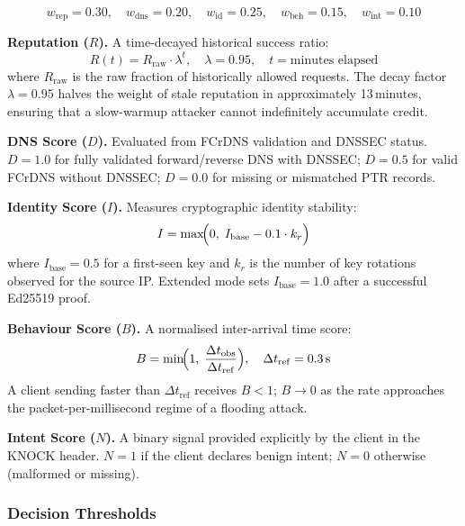 \documentclass[10pt,conference]{IEEEtran}
\begin{document}
\begin{equation}
  w_{\mathrm{rep}} = 0.30,\quad
  w_{\mathrm{dns}} = 0.20,\quad
  w_{\mathrm{id}}  = 0.25,\quad
  w_{\mathrm{beh}} = 0.15,\quad
  w_{\mathrm{int}} = 0.10
\end{equation}

\textbf{Reputation ($R$).}  A time-decayed historical success ratio:
\begin{equation}
  \label{eq:rep}
  R(t) = R_{\mathrm{raw}} \cdot \lambda^{t},
  \quad \lambda = 0.95,\quad t = \text{minutes elapsed}
\end{equation}
where $R_{\mathrm{raw}}$ is the raw fraction of historically allowed
requests.  The decay factor $\lambda = 0.95$ halves the weight of
stale reputation in approximately 13\,minutes, ensuring that a
slow-warmup attacker cannot indefinitely accumulate credit.

\textbf{DNS Score ($D$).}  Evaluated from FCrDNS validation and
DNSSEC status.  $D = 1.0$ for fully validated forward/reverse DNS
with DNSSEC; $D = 0.5$ for valid FCrDNS without DNSSEC; $D = 0.0$
for missing or mismatched PTR records.

\textbf{Identity Score ($I$).}  Measures cryptographic identity
stability:
\begin{equation}
  I = \max\!\Bigl(0,\; I_{\mathrm{base}} - 0.1 \cdot k_r\Bigr)
\end{equation}
where $I_{\mathrm{base}} = 0.5$ for a first-seen key and $k_r$ is the
number of key rotations observed for the source IP.  Extended mode
sets $I_{\mathrm{base}} = 1.0$ after a successful Ed25519 proof.

\textbf{Behaviour Score ($B$).}  A normalised inter-arrival time score:
\begin{equation}
  B = \min\!\Bigl(1,\; \frac{\Delta t_{\mathrm{obs}}}{\Delta t_{\mathrm{ref}}}\Bigr),
  \quad \Delta t_{\mathrm{ref}} = 0.3\,\mathrm{s}
\end{equation}
A client sending faster than $\Delta t_{\mathrm{ref}}$ receives $B < 1$;
$B \rightarrow 0$ as the rate approaches the packet-per-millisecond
regime of a flooding attack.

\textbf{Intent Score ($N$).}  A binary signal provided explicitly by
the client in the KNOCK header.  $N = 1$ if the client declares
benign intent; $N = 0$ otherwise (malformed or missing).

\subsubsection{Decision Thresholds}
\end{document}
